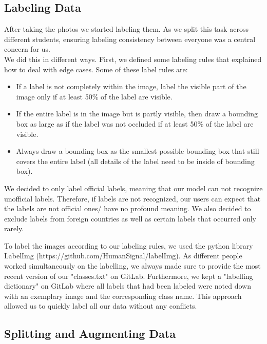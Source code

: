 \subsection{Labeling Data}
\label{ch:Foundations:sec:Section2}
After taking the photos we started labeling them. As we split this task across different students, ensuring labeling consistency between everyone was a central concern for us. \\
We did this in different ways. First, we defined some labeling rules that explained how to deal with edge cases. Some of these label rules are:
\begin{itemize}
  \item If a label is not completely within the image, label the visible part of the image only if at least 50\% of the label are visible.
  \item If the entire label is in the image but is partly visible, then draw a bounding box as large as if the label was not occluded if at least 50\% of the label are visible.
  \item Always draw a bounding box as the smallest possible bounding box that still covers the entire label (all details of the label need to be inside of bounding box).
\end{itemize}

We decided to only label official labels, meaning that our model can not recognize unofficial labels. Therefore, if labels are not recognized, our users can expect that the labels are not official ones/ have no profound meaning. We also decided to exclude labels from foreign countries as well as certain labels that occurred only rarely.

To label the images according to our labeling rules, we used the python library LabelImg (https://github.com/HumanSignal/labelImg). As different people worked simultaneously on the labelling, we always made sure to provide the most recent version of our "classes.txt" on GitLab. Furthermore, we kept a "labelling dictionary" on GitLab where all labels that had been labeled were noted down with an exemplary image and the corresponding class name.
This approach allowed us to quickly label all our data without any conflicts.


\subsection{Splitting and Augmenting Data}
\label{ch:Foundations:sec:Section2}

